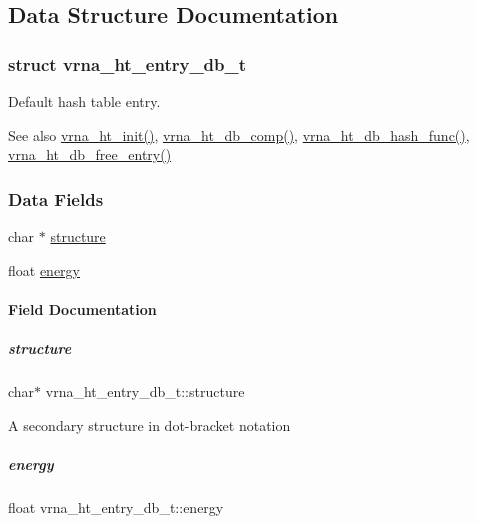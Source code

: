 \subsection{Data Structure Documentation}
\label{structvrna__ht__entry__db__t}
\subsubsection{struct vrna\+\_\+ht\+\_\+entry\+\_\+db\+\_\+t}
Default hash table entry. 

\begin{DoxySeeAlso}{See also}
\mbox{\hyperlink{group__hash__table__utils_ga37d1c7e13087a2b7c1b87fda34577c29}{vrna\+\_\+ht\+\_\+init()}}, \mbox{\hyperlink{group__hash__table__utils_gac4ec0b8372d50d7347a63f140f340962}{vrna\+\_\+ht\+\_\+db\+\_\+comp()}}, \mbox{\hyperlink{group__hash__table__utils_gad133721a3cd2f8ca259fe315d86035a7}{vrna\+\_\+ht\+\_\+db\+\_\+hash\+\_\+func()}}, \mbox{\hyperlink{group__hash__table__utils_gabcdcd0d070b3dfd2634a09e7838acf66}{vrna\+\_\+ht\+\_\+db\+\_\+free\+\_\+entry()}} 
\end{DoxySeeAlso}
\subsubsection*{Data Fields}
\begin{DoxyCompactItemize}
\item 
char $\ast$ \mbox{\hyperlink{group__hash__table__utils_a094ce43244eced065ea0e5fa50287a25}{structure}}
\item 
float \mbox{\hyperlink{group__hash__table__utils_afffab6040a5cfc3ac465d94d8538d88a}{energy}}
\end{DoxyCompactItemize}


\paragraph{Field Documentation}
\mbox{\label{group__hash__table__utils_a094ce43244eced065ea0e5fa50287a25}} 
\subparagraph{\texorpdfstring{structure}{structure}}
{\footnotesize\ttfamily char$\ast$ vrna\+\_\+ht\+\_\+entry\+\_\+db\+\_\+t\+::structure}

A secondary structure in dot-\/bracket notation \mbox{\label{group__hash__table__utils_afffab6040a5cfc3ac465d94d8538d88a}} 
\subparagraph{\texorpdfstring{energy}{energy}}
{\footnotesize\ttfamily float vrna\+\_\+ht\+\_\+entry\+\_\+db\+\_\+t\+::energy}

